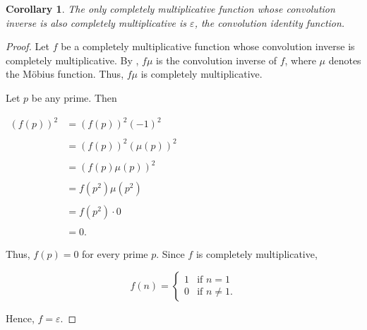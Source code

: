 \documentclass[12pt]{article}
\newtheorem{cor*}{Corollary}
\begin{document}
\begin{cor*}
The only completely multiplicative function whose convolution inverse is also completely multiplicative is $\varepsilon$, the convolution identity function.
\end{cor*}

\begin{proof}
Let $f$ be a completely multiplicative function whose convolution inverse is completely multiplicative.  By , $f\mu$ is the convolution inverse of $f$, where $\mu$ denotes the M\"{o}bius function.  Thus, $f\mu$ is completely multiplicative.

Let $p$ be any prime.  Then

\begin{center}
$\begin{array}{rl}
(f(p))^2 & =(f(p))^2(-1)^2 \\
\\
& =(f(p))^2(\mu(p))^2 \\
\\
& =(f(p)\mu(p))^2 \\
\\
& =f(p^2)\mu(p^2) \\
\\
& =f(p^2) \cdot 0 \\
\\
& =0. \end{array}$
\end{center}

Thus, $f(p)=0$ for every prime $p$.  Since $f$ is completely multiplicative,

$$f(n)=\begin{cases}
1 & \text{if } n=1 \\
0 & \text{if } n\neq 1. \end{cases}$$

Hence, $f=\varepsilon$.
\end{proof}
\end{document}

